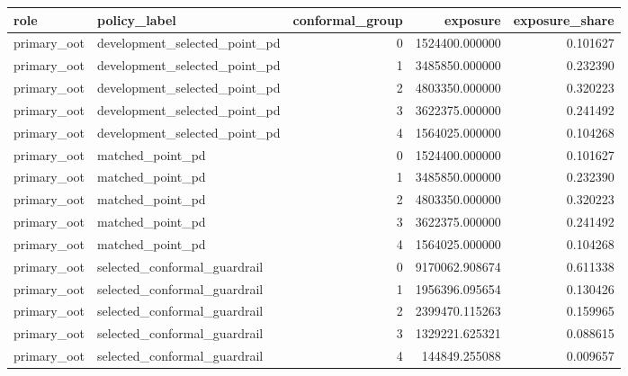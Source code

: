 \begin{tabular}{llrrr}
\toprule
role & policy\_label & conformal\_group & exposure & exposure\_share \\
\midrule
primary\_oot & development\_selected\_point\_pd & 0 & 1524400.000000 & 0.101627 \\
primary\_oot & development\_selected\_point\_pd & 1 & 3485850.000000 & 0.232390 \\
primary\_oot & development\_selected\_point\_pd & 2 & 4803350.000000 & 0.320223 \\
primary\_oot & development\_selected\_point\_pd & 3 & 3622375.000000 & 0.241492 \\
primary\_oot & development\_selected\_point\_pd & 4 & 1564025.000000 & 0.104268 \\
primary\_oot & matched\_point\_pd & 0 & 1524400.000000 & 0.101627 \\
primary\_oot & matched\_point\_pd & 1 & 3485850.000000 & 0.232390 \\
primary\_oot & matched\_point\_pd & 2 & 4803350.000000 & 0.320223 \\
primary\_oot & matched\_point\_pd & 3 & 3622375.000000 & 0.241492 \\
primary\_oot & matched\_point\_pd & 4 & 1564025.000000 & 0.104268 \\
primary\_oot & selected\_conformal\_guardrail & 0 & 9170062.908674 & 0.611338 \\
primary\_oot & selected\_conformal\_guardrail & 1 & 1956396.095654 & 0.130426 \\
primary\_oot & selected\_conformal\_guardrail & 2 & 2399470.115263 & 0.159965 \\
primary\_oot & selected\_conformal\_guardrail & 3 & 1329221.625321 & 0.088615 \\
primary\_oot & selected\_conformal\_guardrail & 4 & 144849.255088 & 0.009657 \\
\bottomrule
\end{tabular}

